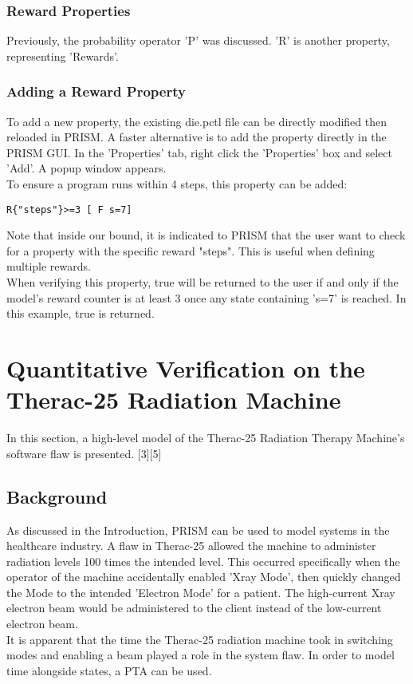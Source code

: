 \documentclass[a4paper]{article}
\begin{document}
\subsubsection{Reward Properties}

Previously, the probability operator 'P' was discussed. 'R' is another property, representing 'Rewards'. 

\subsubsection{Adding a Reward Property}
To add a new property, the existing die.pctl file can be directly modified then reloaded in PRISM. A faster alternative is to add the property directly in the PRISM GUI. In the 'Properties' tab, right click the 'Properties' box and select 'Add'. A popup window appears.
\\[1\baselineskip]
To ensure a program runs within 4 steps, this property can be added:

\begin{lstlisting}
R{"steps"}>=3 [ F s=7]
\end{lstlisting}
Note that inside our bound, it is indicated to PRISM that the user want to check for a property with the specific reward {"steps"}. This is useful when defining multiple rewards.
\\[1\baselineskip]
When verifying this property, true will be returned to the user if and only if the model's reward counter is at least 3 once any state containing 's=7' is reached. In this example, true is returned. 


\section{Quantitative Verification on the Therac-25 Radiation Machine}
In this section, a high-level model of the Therac-25 Radiation Therapy Machine's software flaw is presented. [3][5]

\subsection{Background}
As discussed in the Introduction, PRISM can be used to model systems in the healthcare industry. A flaw in Therac-25 allowed the machine to administer radiation levels 100 times the intended level. This occurred specifically when the operator of the machine accidentally enabled 'Xray Mode', then quickly changed the Mode to the intended 'Electron Mode' for a patient. The high-current Xray electron beam would be administered to the client instead of the low-current electron beam. 
\\[1\baselineskip]
It is apparent that the time the Therac-25 radiation machine took in switching modes and enabling a beam played a role in the system flaw. In order to model time alongside states, a PTA can be used. 
\end{document}
